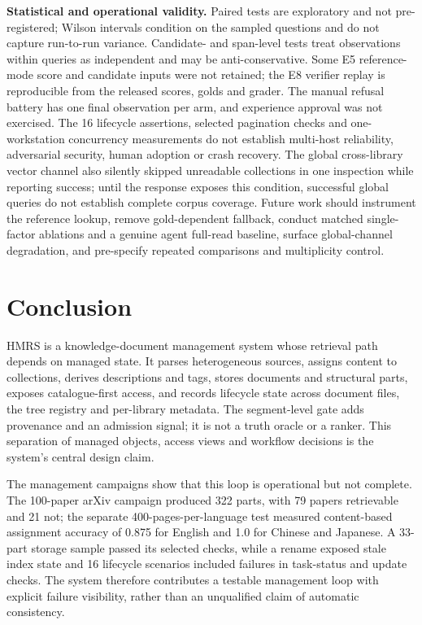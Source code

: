 \documentclass[11pt]{article}
\begin{document}
\noindent\textbf{Statistical and operational validity.} Paired tests are
exploratory and not pre-registered; Wilson intervals condition on the sampled
questions and do not capture run-to-run variance. Candidate- and span-level
tests treat observations within queries as independent and may be
anti-conservative. Some E5 reference-mode score and candidate inputs were not retained; the E8
verifier replay is reproducible from the released scores, golds and grader.
The manual refusal battery has one final observation per arm, and experience
approval was not exercised. The 16 lifecycle assertions, selected pagination
checks and one-workstation concurrency measurements do not establish multi-host
reliability, adversarial security, human adoption or crash recovery. The global
cross-library vector channel also silently skipped unreadable collections in
one inspection while reporting success; until the response exposes this
condition, successful global queries do not establish complete corpus coverage.
Future work should instrument the reference lookup, remove gold-dependent
fallback, conduct matched single-factor ablations and a genuine agent full-read
baseline, surface global-channel degradation, and pre-specify repeated
comparisons and multiplicity control.


\section{Conclusion}


HMRS is a knowledge-document management system whose retrieval path depends on
managed state. It parses heterogeneous sources, assigns content to collections,
derives descriptions and tags, stores documents and structural parts, exposes
catalogue-first access, and records lifecycle state across document files, the
tree registry and per-library metadata. The segment-level gate adds provenance
and an admission signal; it is not a truth oracle or a ranker. This separation
of managed objects, access views and workflow decisions is the system's central
design claim.

The management campaigns show that this loop is operational but not complete.
The 100-paper arXiv campaign produced 322 parts, with 79 papers retrievable and
21 not; the separate 400-pages-per-language test measured content-based
assignment accuracy of 0.875 for English and 1.0 for Chinese and Japanese. A
33-part storage sample passed its selected checks, while a rename exposed stale
index state and 16 lifecycle scenarios included failures in task-status and
update checks. The system therefore contributes a testable management loop with
explicit failure visibility, rather than an unqualified claim of automatic
consistency.
\end{document}
